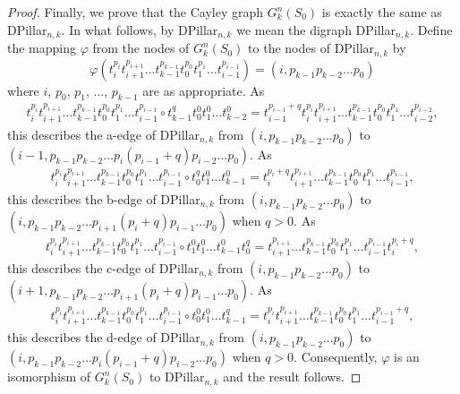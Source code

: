 \documentclass{article}
\begin{document}
\begin{proof}
Finally, we prove that the Cayley graph $G_k^n(S_0)$ is exactly the same as DPillar$_{n,k}$. In what follows, by DPillar$_{n,k}$ we mean the digraph DPillar$_{n,k}$. Define the mapping $\varphi$ from the nodes of $G_k^n(S_0)$ to the nodes of DPillar$_{n,k}$ by
$$\varphi(t_i^{p_i}t_{i+1}^{p_{i+1}}\ldots t_{k-1}^{p_{k-1}}t_0^{p_0}t_1^{p_1}\ldots t_{i-1}^{p_{i-1}}) = (i,p_{k-1}p_{k-2}\ldots p_0)$$
where $i$, $p_0$, $p_1$, $\ldots$, $p_{k-1}$ are as appropriate. As
\begin{align*}
  t_i^{p_i}t_{i+1}^{p_{i+1}}\ldots t_{k-1}^{p_{k-1}}t_0^{p_0}t_1^{p_1}\ldots t_{i-1}^{p_{i-1}} \circ t_{k-1}^{q}t_{0}^{0} t_{1}^{0}\ldots t_{k-2}^{0}
   = t_{i-1}^{p_{i-1}+q}t_i^{p_i}t_{i+1}^{p_{i+1}}\ldots t_{k-1}^{p_{k-1}}t_0^{p_0}t_1^{p_1}\ldots t_{i-2}^{p_{i-2}},
\end{align*}
this describes the a-edge of DPillar$_{n,k}$ from $(i,p_{k-1}p_{k-2}\ldots p_{0})$ to $(i-1,p_{k-1}p_{k-2}\ldots p_{i}(p_{i-1}+q)p_{i-2}\dots p_{0})$. As
\begin{align*}
t_i^{p_i}t_{i+1}^{p_{i+1}}\ldots t_{k-1}^{p_{k-1}}t_0^{p_0}t_1^{p_1}\ldots t_{i-1}^{p_{i-1}} \circ t_{0}^{q}t_{1}^{0} \ldots t_{k-1}^{0}
  = t_i^{p_i+q}t_{i+1}^{p_{i+1}}\ldots t_{k-1}^{p_{k-1}}t_0^{p_0}t_1^{p_1}\ldots t_{i-1}^{p_{i-1}},
\end{align*}
this describes the b-edge of DPillar$_{n,k}$ from $(i,p_{k-1}p_{k-2}\ldots
p_{0})$ to $(i,p_{k-1}p_{k-2}\ldots p_{i+1}(p_i+q)p_{i-1}\ldots p_0)$ when $q
>0$. As
\begin{align*}
  t_i^{p_i}t_{i+1}^{p_{i+1}}\ldots t_{k-1}^{p_{k-1}}t_0^{p_0}t_1^{p_1}\ldots t_{i-1}^{p_{i-1}} \circ t_1^{0}t_{1}^{0}\ldots t_{k-1}^{0}t_0^{q}
  = t_{i+1}^{p_{i+1}}\ldots t_{k-1}^{p_{k-1}}t_0^{p_0}t_1^{p_1}\ldots
  t_{i-1}^{p_{i-1}}t_i^{p_i+q},
\end{align*}
this describes the c-edge of DPillar$_{n,k}$ from $(i,p_{k-1}p_{k-2}\ldots p_{0})$ to $(i+1,p_{k-1}p_{k-2}\ldots p_{i+1}(p_i+q)p_{i-1}\dots p_{0})$. As
\begin{align*}
t_i^{p_i}t_{i+1}^{p_{i+1}}\ldots t_{k-1}^{p_{k-1}}t_0^{p_0}t_1^{p_1}\ldots t_{i-1}^{p_{i-1}} \circ t_{0}^{0}t_{1}^{0} \ldots t_{k-1}^{q}
  = t_i^{p_i}t_{i+1}^{p_{i+1}}\ldots t_{k-1}^{p_{k-1}}t_0^{p_0}t_1^{p_1}\ldots t_{i-1}^{p_{i-1}+q},
\end{align*}
this describes the d-edge of DPillar$_{n,k}$ from $(i,p_{k-1}p_{k-2}\ldots p_{0})$ to $(i,p_{k-1}p_{k-2}\ldots p_i(p_{i-1}+q)p_{i-2}\dots p_{0})$ when $q>0$. Consequently, $\varphi$ is an isomorphism of $G_k^n(S_0)$ to DPillar$_{n,k}$ and the result follows.\end{proof}
\end{document}
